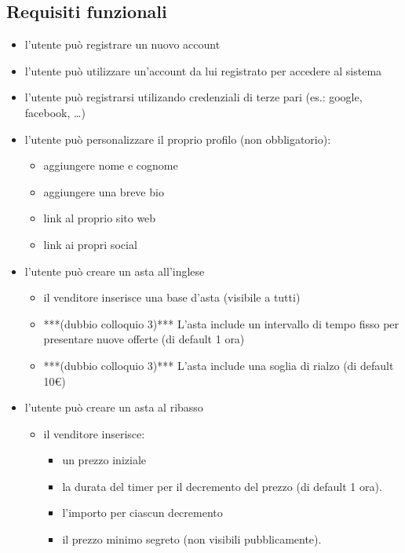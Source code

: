 \subsection{Requisiti funzionali}
\begin{itemize}
	\item l'utente può registrare un nuovo account
	\item l'utente può utilizzare un'account da lui registrato per accedere al sistema
	\item l'utente può registrarsi utilizando credenziali di terze pari (es.: google, facebook, …)
	\item l'utente può personalizzare il proprio profilo (non obbligatorio):
	      \begin{itemize}[label={\tiny$\blacksquare$}]
		      \renewcommand{\labelitemi}{\tiny$\blacksquare$}
		      \item aggiungere nome e cognome
		      \item aggiungere una breve bio
		      \item link al proprio sito web
		      \item link ai propri social
	      \end{itemize}
	      \medskip
	\item l'utente può creare un asta all'inglese
	      \begin{itemize}[label={\tiny$\blacksquare$}]
		      \item il venditore inserisce una base d'asta (visibile a tutti)
		      \item ***(dubbio colloquio 3)*** L'asta include un intervallo di tempo fisso per presentare nuove offerte (di default 1 ora)
		      \item ***(dubbio colloquio 3)*** L'asta include una soglia di rialzo (di default 10€)
	      \end{itemize}
	\item l'utente può creare un asta al ribasso
	      \begin{itemize}[label={\tiny$\blacksquare$}]
		      \item il venditore inserisce:
		            \begin{itemize}[label={\tiny$-$}]
			            \item un prezzo iniziale
			            \item la durata del timer per il decremento del prezzo (di default 1 ora).
			            \item l'importo per ciascun decremento
			            \item il prezzo minimo segreto (non visibili pubblicamente).

\end{itemize}
\end{itemize}
\end{itemize}
